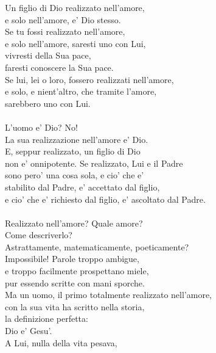 \begin{haiku}
    Un figlio di Dio realizzato nell'amore,\\
    e solo nell'amore, e' Dio stesso.\\
    Se tu fossi realizzato nell'amore,\\
    e solo nell'amore, saresti uno con Lui,\\
    vivresti della Sua pace,\\
    faresti conoscere la Sua pace.\\
    Se lui, lei o loro, fossero realizzati nell'amore,\\
    e solo, e nient'altro, che tramite l'amore,\\
    sarebbero uno con Lui.\\
    \\
    L'uomo e' Dio? No!\\
    La sua realizzazione nell'amore e' Dio.\\
    E, seppur realizzato, un figlio di Dio \\
    non e' onnipotente. Se realizzato, Lui e il Padre\\
    sono pero' una cosa sola, e cio' che e' \\
    stabilito dal Padre, e' accettato dal figlio,\\
    e cio' che e' richiesto dal figlio, e' ascoltato dal Padre.\\
    \leavevmode\\
    Realizzato nell'amore? Quale amore?\\
    Come descriverlo?\\
    Astrattamente, matematicamente, poeticamente?\\
    Impossibile! Parole troppo ambigue, \\
    e troppo facilmente prospettano miele,\\
    pur essendo scritte con mani sporche.\\
    Ma un uomo, il primo totalmente realizzato nell'amore,\\
    con la sua vita ha scritto nella storia,\\
    la definizione perfetta:\\
    \hspace{1cm} Dio e' Gesu'.\\
    A Lui, nulla della vita pesava,\\

\end{haiku}
